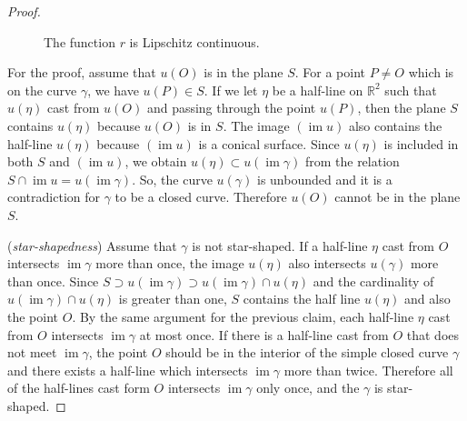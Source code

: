 \documentclass{amsart}
\theoremstyle{plain}
\theoremstyle{definition}
\theoremstyle{remark}
\DeclareMathOperator{\im}{im}
\begin{document}
\begin{proof}
\begin{figure}%
\caption{The function $r$ is Lipschitz continuous.}
\end{figure}


For the proof, 
assume that $u(O)$ is in the plane $S$.
For a point $P\ne O$ which is on the curve $\gamma$, we have $u(P)\in S$.
If we let $\eta$ be a half-line on $\mathbb{R}^2$ such that $u(\eta)$ cast from $u(O)$ and passing through the point $u(P)$, then the plane $S$ contains $u(\eta)$ because $u(O)$ is in $S$.
The image $(\im u)$ also contains the half-line $u(\eta)$ because $(\im u)$ is a conical surface.
Since $u(\eta)$ is included in both $S$ and $(\im u)$, we obtain $u(\eta)\subset u(\im\gamma)$ from the relation $S\cap\im u=u(\im \gamma)$.
So, the curve $u(\gamma)$ is unbounded and it is a contradiction for $\gamma$ to be a closed curve.
Therefore $u(O)$ cannot be in the plane $S$.

(\emph{star-shapedness})
Assume that $\gamma$ is not star-shaped.
If a half-line $\eta$ cast from $O$ intersects $\im\gamma$ more than once, the image $u(\eta)$ also intersects $u(\gamma)$ more than once.
Since $S\supset u(\im\gamma)\supset u(\im\gamma)\cap u(\eta)$ and the cardinality of $u(\im\gamma)\cap u(\eta)$ is greater than one, $S$ contains the half line $u(\eta)$ and also the point $O$.
By the same argument for the previous claim, 
each half-line $\eta$ cast from $O$ intersects $\im\gamma$ at most once.
If there is a half-line cast from $O$ that does not meet $\im\gamma$, the point $O$ should be in the interior of the simple closed curve $\gamma$ and there exists a half-line which intersects $\im\gamma$ more than twice.
Therefore all of the half-lines cast form $O$ intersects $\im\gamma$ only once, and the $\gamma$ is star-shaped.


\end{proof}
\end{document}
